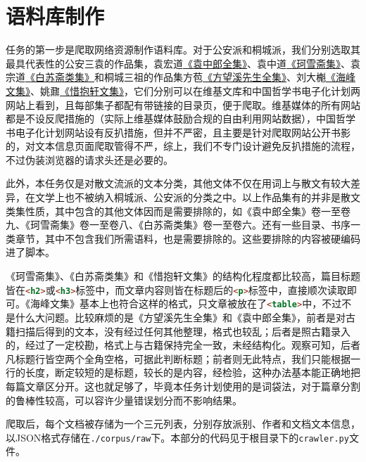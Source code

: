 \documentclass[12pt, a4paper, oneside]{ctexart}
\begin{document}
\section{语料库制作}

任务的第一步是爬取网络资源制作语料库。对于公安派和桐城派，我们分别选取其最具代表性的公安三袁的作品集，袁宏道\href{https://ctext.org/wiki.pl?if=gb&res=142162&remap=gb}{《袁中郎全集》}、袁中道\href{https://zh.wikisource.org/wiki/珂雪齋集}{《珂雪斋集》}、袁宗道\href{https://zh.wikisource.org/zh-hant/白蘇齋類集}{《白苏斋类集》}和桐城三祖的作品集方苞\href{https://zh.wikisource.org/wiki/方望溪先生全集_(四部叢刊本)}{《方望溪先生全集》}、刘大櫆\href{https://ctext.org/wiki.pl?if=gb&res=110875}{《海峰文集》}、姚鼐\href{https://zh.wikisource.org/wiki/惜抱軒文集}{《惜抱轩文集》}，它们分别可以在维基文库和中国哲学书电子化计划两网站上看到，且每部集子都配有带链接的目录页，便于爬取。维基媒体的所有网站都是不设反爬措施的（实际上维基媒体鼓励合规的自由利用网站数据），中国哲学书电子化计划网站设有反扒措施，但并不严密，且主要是针对爬取网站公开书影的，对文本信息页面爬取管得不严，综上，我们不专门设计避免反扒措施的流程，不过伪装浏览器的请求头还是必要的。

此外，本任务仅是对散文流派的文本分类，其他文体不仅在用词上与散文有较大差异，在文学上也不被纳入桐城派、公安派的分类之中。以上作品集有的并非是散文类集性质，其中包含的其他文体因而是需要排除的，如《袁中郎全集》卷一至卷九、《珂雪斋集》卷一至卷八、《白苏斋类集》卷一至卷六。还有一些目录、书序一类章节，其中不包含我们所需语料，也是需要排除的。这些要排除的内容被硬编码进了脚本。

《珂雪斋集》、《白苏斋类集》和《惜抱轩文集》的结构化程度都比较高，篇目标题皆在\lstinline[language=html]!<h2>!或\lstinline[language=html]!<h3>!标签中，而文章内容则皆在标题后的\lstinline[language=html]!<p>!标签中，直接顺次读取即可。《海峰文集》基本上也符合这样的格式，只文章被放在了\lstinline[language=html]!<table>!中，不过不是什么大问题。比较麻烦的是《方望溪先生全集》和《袁中郎全集》，前者是对古籍扫描后得到的文本，没有经过任何其他整理，格式也较乱；后者是照古籍录入的，经过了一定校勘，格式上与古籍保持完全一致，未经结构化。观察可知，后者凡标题行皆空两个全角空格，可据此判断标题；前者则无此特点，我们只能根据一行的长度，断定较短的是标题，较长的是内容，经检验，这种办法基本能正确地把每篇文章区分开。这也就足够了，毕竟本任务计划使用的是词袋法，对于篇章分割的鲁棒性较高，可以容许少量错误划分而不影响结果。

爬取后，每个文档被存储为一个三元列表，分别存放派别、作者和文档文本信息，以JSON格式存储在\verb!./corpus/raw!下。本部分的代码见于根目录下的\verb!crawler.py!文件。
\end{document}
